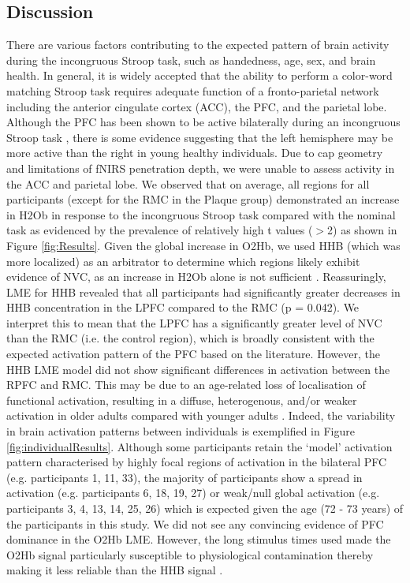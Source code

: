 \documentclass[12pt]{spieman}  %
\begin{document}
\begin{spacing}{2}
\section{Discussion}
There are various factors contributing to the expected pattern of brain activity during the incongruous Stroop task, such as handedness, age, sex, and brain health\cite{Beratis2010, Lague-Beauvais2013a, Li2009, Milham2002, Vendrell1995, Cuevas2016}. In general, it is widely accepted that the ability to perform a  color-word matching Stroop task requires adequate function of a fronto-parietal network including the anterior cingulate cortex (ACC), the PFC, and the parietal lobe\cite{Roberts2008, Laird2005, Li2009, Vanderhasselt2009}. Although the PFC has been shown to be active bilaterally during an incongruous Stroop task \cite{Lague-Beauvais2013a, Milham2002, Zysset2001}, there is some evidence suggesting that the left hemisphere may be more active than the right  in young healthy individuals\cite{Jonides2000}. Due to cap geometry and limitations of fNIRS penetration depth, we were unable to assess activity in the ACC and parietal lobe. We observed that on average, all regions for all participants (except for the RMC in the Plaque group) demonstrated an increase in H2Ob in response to the incongruous Stroop task compared with the nominal task as evidenced by the prevalence of relatively high t values ($>$2) as shown in Figure \ref{fig:Results}. Given the global increase in O2Hb, we used HHB (which was more localized) as an arbitrator to determine which regions likely exhibit evidence of NVC, as an increase in H2Ob alone is not sufficient \cite{Pinti2021}. Reassuringly, LME for HHB revealed that all participants had significantly greater decreases in HHB concentration in the LPFC compared to the RMC (p = 0.042). We interpret this to mean that the LPFC has a significantly greater level of NVC than the RMC (i.e. the control region), which is broadly consistent with the expected activation pattern of the PFC based on the literature. However, the HHB LME model did not show significant differences in activation between the RPFC and RMC. This may be due to an age-related loss of localisation of functional activation, resulting in a diffuse, heterogenous, and/or weaker activation in older adults compared with younger adults \cite{Lague-Beauvais2013a, Milham2002,Schroeter2003}. Indeed, the variability in brain activation patterns between individuals is exemplified in Figure \ref{fig:individualResults}. Although some participants retain the `model' activation pattern characterised by highly focal regions of activation in the bilateral PFC (e.g. participants 1, 11, 33), the majority of participants show a spread in activation (e.g. participants 6, 18, 19, 27) or weak/null global activation (e.g. participants 3, 4, 13, 14, 25, 26) which is expected given the age (72 - 73 years) of the participants in this study. We did not see any convincing evidence of PFC dominance in the O2Hb LME. However, the long stimulus times used made the O2Hb signal particularly susceptible to physiological contamination thereby making it less reliable than the HHB signal \cite{Tachtsidis2016}. 


\end{spacing}
\end{document}
